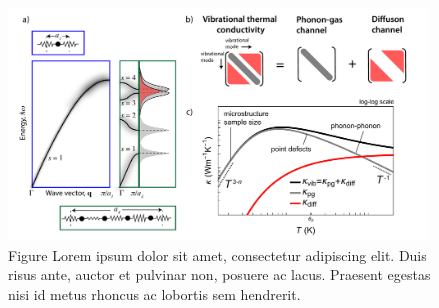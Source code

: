 \begin{figure}
  \centering
  \includegraphics[width=0.99\textwidth, keepaspectratio]{test-fig.pdf}
  \caption{Figure Lorem ipsum dolor sit amet, consectetur adipiscing elit. Duis risus ante, auctor et pulvinar non, posuere ac lacus. Praesent egestas nisi id metus rhoncus ac lobortis sem hendrerit.}
  \label{fig:test}
\end{figure}



